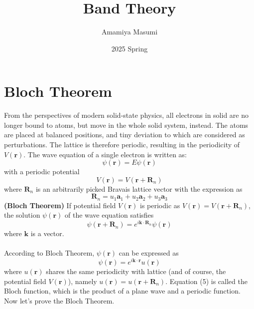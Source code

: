 \documentclass{article}
\title{Band Theory}
\author{Amamiya Masumi}
\date{2025 Spring}
\begin{document}
\maketitle

\section{Bloch Theorem}
From the perspectives of modern solid-state physics, all electrons in solid are no longer bound to atoms, but move in the whole solid system, instead. The atoms are placed at balanced positions, and tiny deviation to which are considered as perturbations. The lattice is therefore periodic, resulting in the periodicity of $V(\mathbf{r})$. The wave equation of a single electron is written as:\begin{equation}
    [-\frac{\hbar^2}{2m}\nabla^2+V(\mathbf{r})]\psi(\mathbf{r})=E\psi(\mathbf{r})
\end{equation}
with a periodic potential\begin{equation}
    V(\mathbf{r})=V(\mathbf{r}+\mathbf{R}_n)
\end{equation}
where $\mathbf{R}_n$ is an arbitrarily picked Bravais lattice vector with the expression as\begin{equation}
    \mathbf{R}_n=u_1\mathbf{a}_1+u_2\mathbf{a}_2+u_3\mathbf{a}_3
\end{equation}
\textbf{(Bloch Theorem)} If potential field $V(\mathbf{r})$ is periodic as $V(\mathbf{r})=V(\mathbf{r}+\mathbf{R}_n)$, the solution $\psi(\mathbf{r})$ of the wave equation satisfies\begin{equation}
    \psi(\mathbf{r}+\mathbf{R}_n)=e^{i\mathbf{k}\cdot\mathbf{R}_n}\psi(\mathbf{r})
\end{equation}
where $\mathbf{k}$ is a vector.\\
\\
According to Bloch Theorem, $\psi(\mathbf{r})$ can be expressed as\begin{equation}
    \psi(\mathbf{r})=e^{i\mathbf{k}\cdot\mathbf{r}}u(\mathbf{r})
\end{equation}
where $u(\mathbf{r})$ shares the same periodicity with lattice (and of course, the potential field $V(\mathbf{r})$), namely $u(\mathbf{r})=u(\mathbf{r}+\mathbf{R}_n)$. Equation (5) is called the Bloch function, which is the product of a plane wave and a periodic function. Now let's prove the Bloch Theorem.
\end{document}
